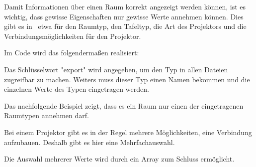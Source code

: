 \label{sec:roomtype}

Damit Informationen über einen Raum korrekt angezeigt werden können, ist es wichtig, dass gewisse Eigenschaften nur gewisse Werte annehmen können. Dies gibt es in \ZELIA\ etwa für den Raumtyp, den Tafeltyp, die Art des Projektors und die Verbindungsmöglichkeiten für den Projektor.

Im Code wird das folgendermaßen realisiert:

Das Schlüsselwort "export" wird angegeben, um den Typ in allen Dateien zugreifbar zu machen. Weiters muss dieser Typ einen Namen bekommen und die einzelnen Werte des Typen eingetragen werden. 

Das nachfolgende Beispiel zeigt, dass es ein Raum nur einen der eingetragenen Raumtypen annehmen darf.


Bei einem Projektor gibt es in der Regel mehrere Möglichkeiten, eine Verbindung aufzubauen. Deshalb gibt es hier eine Mehrfachauswahl.

Die Auswahl mehrerer Werte wird durch ein Array zum Schluss ermöglicht.

